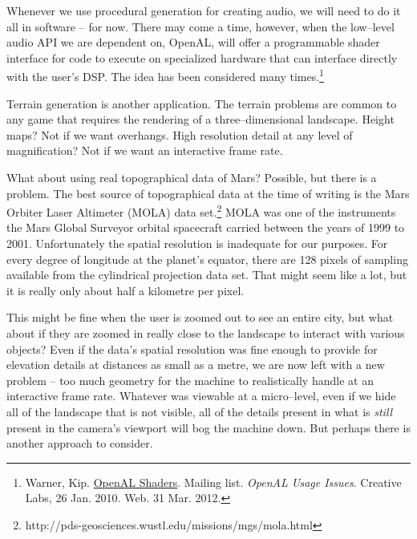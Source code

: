 Whenever we use procedural generation for creating audio, we will need to do it all in software -- for now. There may come a time, however, when the low--level audio API we are dependent on, OpenAL, will offer a programmable shader interface for code to execute on specialized hardware that can interface directly with the user's DSP. The idea has been considered many times.\footnote{Warner, Kip. \href{http://opensource.creative.com/pipermail/openal/2010-January/011972.html}{OpenAL Shaders}. Mailing list. {\it OpenAL Usage Issues}. Creative Labs, 26 Jan. 2010. Web. 31 Mar. 2012.}

Terrain generation is another application. The terrain problems are common to any game that requires the rendering of a three--dimensional landscape. Height maps? Not if we want overhangs. High resolution detail at any level of magnification? Not if we want an interactive frame rate.

What about using real topographical data of Mars? Possible, but there is a problem. The best source of topographical data at the time of writing is the Mars Orbiter Laser Altimeter (MOLA) data set.\footnote{http://pds-geosciences.wustl.edu/missions/mgs/mola.html} MOLA was one of the instruments the Mars Global Surveyor orbital spacecraft carried between the years of 1999 to 2001. Unfortunately the spatial resolution is inadequate for our purposes. For every degree of longitude at the planet's equator, there are 128 pixels of sampling available from the cylindrical projection data set. That might seem like a lot, but it is really only about half a kilometre per pixel.

This might be fine when the user is zoomed out to see an entire city, but what about if they are zoomed in really close to the landscape to interact with various objects? Even if the data's spatial resolution was fine enough to provide for elevation details at distances as small as a metre, we are now left with a new problem -- too much geometry for the machine to realistically handle at an interactive frame rate. Whatever was viewable at a micro--level, even if we hide all of the landscape that is not visible, all of the details present in what is {\it still} present in the camera's viewport will bog the machine down. But perhaps there is another approach to consider.

